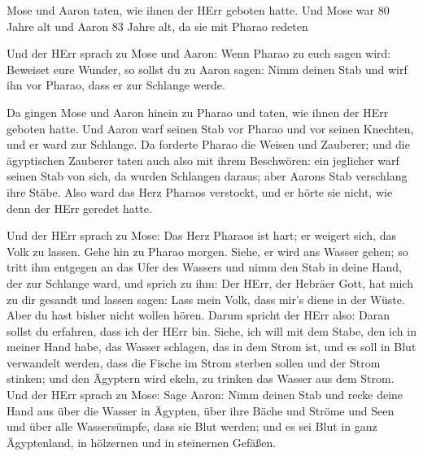  Mose und Aaron taten, wie ihnen der HErr geboten hatte.
 Und Mose war 80 Jahre alt und Aaron 83 Jahre alt, da sie
mit Pharao redeten

 Und der HErr sprach zu Mose und Aaron:  Wenn
Pharao zu euch sagen wird: Beweiset eure Wunder, so sollst du zu Aaron
sagen: Nimm deinen Stab und wirf ihn vor Pharao, dass er zur Schlange
werde.

 Da gingen Mose und Aaron hinein zu Pharao und taten, wie
ihnen der HErr geboten hatte. Und Aaron warf seinen Stab vor Pharao und
vor seinen Knechten, und er ward zur Schlange.  Da forderte
Pharao die Weisen und Zauberer; und die ägyptischen Zauberer taten auch
also mit ihrem Beschwören:  ein jeglicher warf seinen Stab
von sich, da wurden Schlangen daraus; aber Aarons Stab verschlang ihre
Stäbe.  Also ward das Herz Pharaos verstockt, und er hörte
sie nicht, wie denn der HErr geredet hatte.

 Und der HErr sprach zu Mose: Das Herz Pharaos ist hart; er
weigert sich, das Volk zu lassen.  Gehe hin zu Pharao
morgen. Siehe, er wird ans Wasser gehen; so tritt ihm entgegen an das
Ufer des Wassers und nimm den Stab in deine Hand, der zur Schlange ward,
 und sprich zu ihm: Der HErr, der Hebräer Gott, hat mich zu
dir gesandt und lassen sagen: Lass mein Volk, dass mir's diene in der
Wüste. Aber du hast bisher nicht wollen hören.  Darum
spricht der HErr also: Daran sollst du erfahren, dass ich der HErr bin.
Siehe, ich will mit dem Stabe, den ich in meiner Hand habe, das Wasser
schlagen, das in dem Strom ist, und es soll in Blut verwandelt werden,
 dass die Fische im Strom sterben sollen und der Strom
stinken; und den Ägyptern wird ekeln, zu trinken das Wasser aus dem
Strom.  Und der HErr sprach zu Mose: Sage Aaron: Nimm
deinen Stab und recke deine Hand aus über die Wasser in Ägypten, über
ihre Bäche und Ströme und Seen und über alle Wassersümpfe, dass sie Blut
werden; und es sei Blut in ganz Ägyptenland, in hölzernen und in
steinernen Gefäßen.

